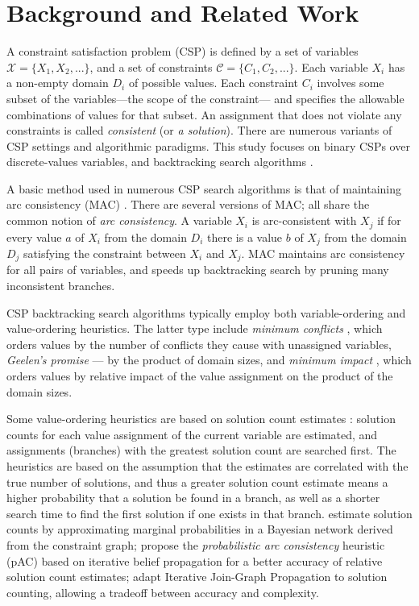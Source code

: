 \section{Background and Related Work}
\label{sec:csp-background}

A constraint satisfaction problem (CSP) is defined by a set
of variables $\mathcal{X}=\{X_1, X_2, ...\}$, and a set of
constraints $\mathcal{C}=\{C_1, C_2, ...\}$. Each variable $X_i$ has a non-empty domain
$D_i$ of possible values. Each constraint $C_i$ involves some subset
of the variables---the scope of the constraint--- and specifies the
allowable combinations of values for that subset. An assignment that
does not violate any constraints is called {\em consistent} (or {\em a solution}).
There are numerous variants of CSP settings and algorithmic paradigms. This
study focuses on binary CSPs over discrete-values variables,
and backtracking search algorithms \cite{Tsang.csp}.

A basic method used in numerous CSP search algorithms is
that of maintaining arc consistency (MAC)
\cite{Sabin.mac}. There are several versions of MAC; all
share the common notion of {\em
arc consistency}.
A variable $X_i$ is arc-consistent with $X_j$ if for every value $a$ of
$X_i$ from the domain $D_i$ there is a value $b$ of $X_j$ from the
domain $D_j$ satisfying the constraint between $X_i$ and $X_j$. MAC
maintains arc consistency for all pairs of variables, and
speeds up backtracking search by pruning many inconsistent
branches.

CSP backtracking search algorithms typically employ both
variable-ordering \cite{Tsang.csp} and value-ordering heuristics.  The
latter type include \emph{minimum conflicts} \cite{Tsang.csp}, which
orders values by the number of conflicts they cause with unassigned
variables, \emph{Geelen's promise} \cite{Geelen.promise} --- by the
product of domain sizes, and \emph{minimum impact}
\cite{Refalo.impact}, which orders values by relative impact of the
value assignment on the product of the domain sizes.

Some value-ordering heuristics are based on solution count estimates
\cite{Dechter.cspheur,Meisels.solcount,HorschHavens.pac,Kask.solcount}:
solution counts for each value assignment of the current variable are
estimated, and assignments (branches) with the greatest solution count
are searched first.  The heuristics are based on the assumption that
the estimates are correlated with the true number of solutions, and
thus a greater solution count estimate means a higher probability that
a solution be found in a branch, as well as a shorter search time to
find the first solution if one exists in that
branch. \cite{Meisels.solcount} estimate solution counts by
approximating marginal probabilities in a Bayesian network derived
from the constraint graph; \cite{HorschHavens.pac} propose the
\emph{probabilistic arc consistency} heuristic (pAC) based on
iterative belief propagation for a better accuracy of relative
solution count estimates; \cite{Kask.solcount} adapt Iterative
Join-Graph Propagation to solution counting, allowing a tradeoff
between accuracy and complexity.

